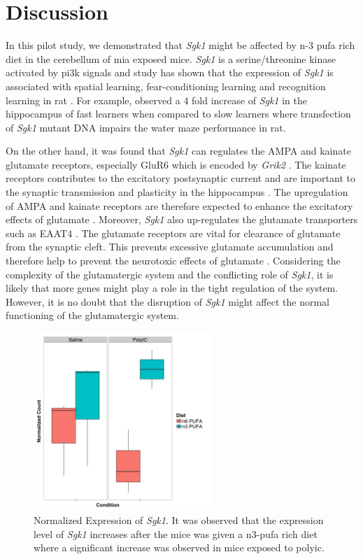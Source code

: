 \section{Discussion}
In this pilot study, we demonstrated that \textit{Sgk1} might be affected by n-3 \gls{pufa} rich diet in the cerebellum of \gls{mia} exposed mice. 
\textit{Sgk1} is a serine/threonine kinase activated by \gls{pi3k} signals and study has shown that the expression of \textit{Sgk1} is associated with spatial learning, fear-conditioning learning and recognition learning in rat \citep{Tsai2002,Lee2003}.
For example, \citet{Tsai2002} observed a 4 fold increase of \textit{Sgk1} in the hippocampus of fast learners when compared to slow learners where transfection of \textit{Sgk1} mutant DNA impairs the water maze performance in rat.

On the other hand, it was found that \textit{Sgk1} can regulates the AMPA and kainate glutamate receptors, especially GluR6 which is encoded by \textit{Grik2} \citep{Lang2006,Lang2010}.
The kainate receptors contributes to the excitatory postsynaptic current and are important to the synaptic transmission and plasticity in the hippocampus \citep{Lang2006}.
The upregulation of AMPA and kainate receptors are therefore expected to enhance the excitatory effects of glutamate \citep{Lang2010}.
Moreover, \textit{Sgk1} also up-regulates the glutamate transporters such as EAAT4 \citep{Bohmer2004}.
The glutamate receptors are vital for clearance of glutamate from the synaptic cleft.
This prevents excessive glutamate accumulation and therefore help to prevent the neurotoxic effects of glutamate \citep{Lang2010}.
Considering the complexity of the glutamatergic system and the conflicting role of \textit{Sgk1}, it is likely that more genes might play a role in the tight regulation of the system.
However, it is no doubt that the disruption of \textit{Sgk1} might affect the normal functioning of the glutamatergic system.
\begin{figure}
	\centering
	\includegraphics[width=0.6\textwidth]{figure/omega/Sgk1_expression.png}
	\caption[Normalized Expression of \textit{Sgk1}]{
		Normalized Expression of \textit{Sgk1}.
		It was observed that the expression level of \textit{Sgk1} increases after the mice was given a n3-\gls{pufa} rich diet where a significant increase was observed in mice exposed to \gls{polyic}.
	}\label{fig:sgk1Express}
\end{figure}

